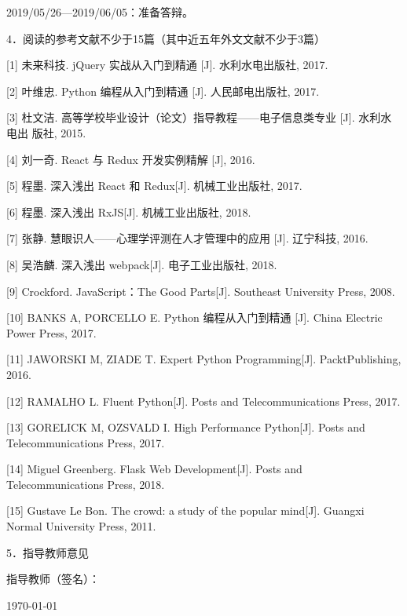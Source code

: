 \documentclass[a4paper]{ctexart}
\begin{document}
2019/05/26—2019/06/05：准备答辩。

\begin{flushleft}
4．阅读的参考文献不少于15篇（其中近五年外文文献不少于3篇）
\end{flushleft}

[1] 未来科技. jQuery 实战从入门到精通 [J]. 水利水电出版社, 2017. 

[2] 叶维忠. Python 编程从入门到精通 [J]. 人民邮电出版社, 2017. 

[3] 杜文洁. 高等学校毕业设计（论文）指导教程——电子信息类专业 [J]. 水利水电出 版社, 2015. 

[4] 刘一奇. React 与 Redux 开发实例精解 [J], 2016. 

[5] 程墨. 深入浅出 React 和 Redux[J]. 机械工业出版社, 2017. 

[6] 程墨. 深入浅出 RxJS[J]. 机械工业出版社, 2018. 

[7] 张静. 慧眼识人——心理学评测在人才管理中的应用 [J]. 辽宁科技, 2016.

[8] 吴浩麟. 深入浅出 webpack[J]. 电子工业出版社, 2018. 

[9] Crockford. JavaScript：The Good Parts[J]. Southeast University Press, 2008. 

[10] BANKS A, PORCELLO E. Python 编程从入门到精通 [J]. China Electric Power Press, 2017. 

[11] JAWORSKI M, ZIADE T. Expert Python Programming[J]. PacktPublishing, 2016. 

[12] RAMALHO L. Fluent Python[J]. Posts and Telecommunications Press, 2017. 

[13] GORELICK M, OZSVALD I. High Performance Python[J]. Posts and Telecommunications Press, 2017. 

[14] Miguel Greenberg. Flask Web Development[J]. Posts and Telecommunications Press, 2018. 

[15] Gustave Le Bon. The crowd: a study of the popular mind[J]. Guangxi Normal University Press, 2011.

\begin{flushleft}
5．指导教师意见

\end{flushleft}
\vskip7.8cm
\begin{flushright}
指导教师（签名）：\quad \quad \quad 

\today
\end{flushright}                  


\end{document}
